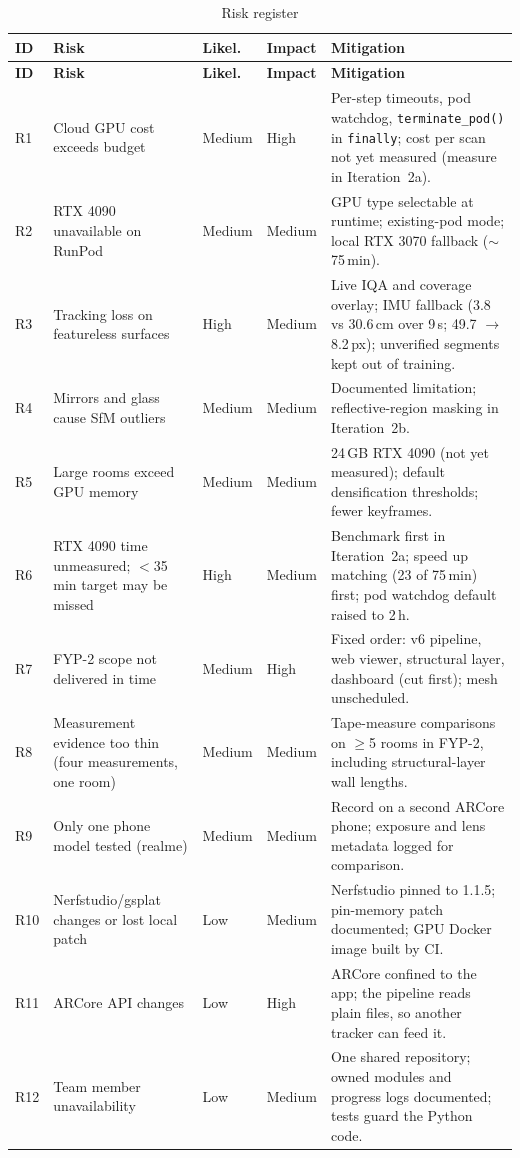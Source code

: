 {\footnotesize\setlength{\tabcolsep}{3pt}
\begin{longtable}{p{}p{}p{}p{}p{}}
\caption{Risk register}\label{tab:risks}\\
\toprule
\textbf{ID} & \textbf{Risk} & \textbf{Likel.} & \textbf{Impact} & \textbf{Mitigation} \\
\midrule
\endfirsthead
\toprule
\textbf{ID} & \textbf{Risk} & \textbf{Likel.} & \textbf{Impact} & \textbf{Mitigation} \\
\midrule
\endhead
R1 & Cloud GPU cost exceeds budget & Medium & High & Per-step timeouts, pod watchdog, \texttt{terminate\_pod()} in \texttt{finally}; cost per scan not yet measured (measure in Iteration~2a). \\
R2 & RTX 4090 unavailable on RunPod & Medium & Medium & GPU type selectable at runtime; existing-pod mode; local RTX 3070 fallback ($\sim$75\,min). \\
R3 & Tracking loss on featureless surfaces & High & Medium & Live IQA and coverage overlay; IMU fallback (3.8 vs 30.6\,cm over 9\,s; 49.7 $\rightarrow$ 8.2\,px); unverified segments kept out of training. \\
R4 & Mirrors and glass cause SfM outliers & Medium & Medium & Documented limitation; reflective-region masking in Iteration~2b. \\
R5 & Large rooms exceed GPU memory & Medium & Medium & 24\,GB RTX 4090 (not yet measured); default densification thresholds; fewer keyframes. \\
R6 & RTX 4090 time unmeasured; $<$35\,min target may be missed & High & Medium & Benchmark first in Iteration~2a; speed up matching (23 of 75\,min) first; pod watchdog default raised to 2\,h. \\
R7 & FYP-2 scope not delivered in time & Medium & High & Fixed order: v6 pipeline, web viewer, structural layer, dashboard (cut first); mesh unscheduled. \\
R8 & Measurement evidence too thin (four measurements, one room) & Medium & Medium & Tape-measure comparisons on $\geq$5 rooms in FYP-2, including structural-layer wall lengths. \\
R9 & Only one phone model tested (realme) & Medium & Medium & Record on a second ARCore phone; exposure and lens metadata logged for comparison. \\
R10 & Nerfstudio/gsplat changes or lost local patch & Low & Medium & Nerfstudio pinned to 1.1.5; pin-memory patch documented; GPU Docker image built by CI. \\
R11 & ARCore API changes & Low & High & ARCore confined to the app; the pipeline reads plain files, so another tracker can feed it. \\
R12 & Team member unavailability & Low & Medium & One shared repository; owned modules and progress logs documented; tests guard the Python code. \\
\bottomrule
\end{longtable}
}

